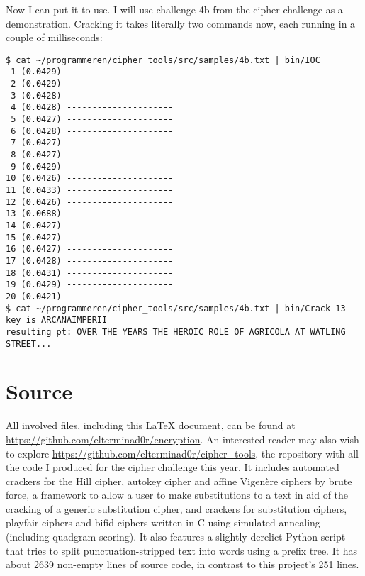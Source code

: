 \documentclass[fleqn,a4paper,11pt]{article}
\begin{document}
    Now I can put it to use. I will use challenge 4b from the cipher challenge
    as a demonstration. Cracking it takes literally two commands now, each
    running in a couple of milliseconds:

\begin{lstlisting}[caption=Cracking 4b, label={lst:iocchart}]
$ cat ~/programmeren/cipher_tools/src/samples/4b.txt | bin/IOC
 1 (0.0429) ---------------------
 2 (0.0429) ---------------------
 3 (0.0428) ---------------------
 4 (0.0428) ---------------------
 5 (0.0427) ---------------------
 6 (0.0428) ---------------------
 7 (0.0427) ---------------------
 8 (0.0427) ---------------------
 9 (0.0429) ---------------------
10 (0.0426) ---------------------
11 (0.0433) ---------------------
12 (0.0426) ---------------------
13 (0.0688) ----------------------------------
14 (0.0427) ---------------------
15 (0.0427) ---------------------
16 (0.0427) ---------------------
17 (0.0428) ---------------------
18 (0.0431) ---------------------
19 (0.0429) ---------------------
20 (0.0421) ---------------------
$ cat ~/programmeren/cipher_tools/src/samples/4b.txt | bin/Crack 13
key is ARCANAIMPERII
resulting pt: OVER THE YEARS THE HEROIC ROLE OF AGRICOLA AT WATLING STREET...
\end{lstlisting}

    \section{Source} All involved files, including this \LaTeX{} document, can
    be found at \url{https://github.com/elterminad0r/encryption}. An
    interested reader may also wish to explore
    \url{https://github.com/elterminad0r/cipher_tools}, the repository with
    all the code I produced for the cipher challenge this year. It includes
    automated crackers for the Hill cipher, autokey cipher and affine
    Vigen\`ere ciphers by brute force, a framework to allow a user to make
    substitutions to a text in aid of the cracking of a generic substitution
    cipher, and crackers for substitution ciphers, playfair ciphers and bifid
    ciphers written in C using simulated annealing (including quadgram
    scoring). It also features a slightly derelict Python script that tries to
    split punctuation-stripped text into words using a prefix tree. It has
    about 2639 non-empty lines of source code, in contrast to this project's
    251 lines.
\end{document}
